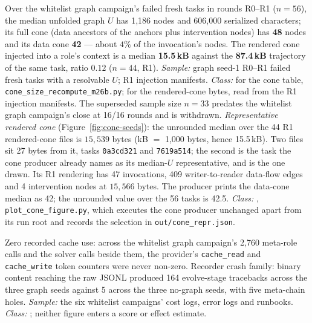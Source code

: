 \begin{description}[leftmargin=0pt,labelindent=0pt,labelsep=0pt,style=nextline,font=\normalfont,itemsep=6pt]
\item[\textbf{F55}\quad Cone size, and the rendered cone against the
      trajectory it competes with.]
Over the whitelist graph campaign's failed fresh tasks in rounds R0--R1
($n{=}56$), the median unfolded graph $U$ has 1{,}186 nodes and
606{,}000 serialized characters; its full cone (data ancestors of the
anchors plus intervention nodes) has \textbf{48} nodes and its data
cone \textbf{42} --- about $4\%$ of the invocation's nodes. The rendered
cone injected into a role's context is a median \textbf{15.5\,kB}
against the \textbf{87.4\,kB} trajectory of the same task, ratio
$0.12$ ($n{=}44$, R1). \emph{Sample:} graph seed-1 R0--R1 failed fresh tasks
with a resolvable $U$; R1 injection manifests. \emph{Class:} 
for the cone table, \texttt{cone\_size\_recompute\_m26b.py}; 
for the rendered-cone bytes, read from the R1 injection manifests. The
superseded sample size $n{=}33$ predates the whitelist graph campaign's
close at 16/16 rounds and is withdrawn.
\emph{Representative rendered cone} (Figure~\ref{fig:cone-seeds}): the
unrounded median over the 44 R1 rendered-cone files is
$15,539$ bytes (kB $=$ 1{,}000 bytes, hence
15.5\,kB). Two files sit 27 bytes from it, tasks \texttt{0a3cd321}
and \texttt{7619a514}; the second is the task the cone producer already
names as its median-$U$ representative, and is the one drawn. Its R1
rendering has 47 invocations, 409 writer-to-reader data-flow edges and 4 intervention nodes at
$15,566$ bytes. The producer prints the data-cone
median as 42; the unrounded value over the 56 tasks is 42.5. \emph{Class:}
, \texttt{plot\_cone\_figure.py}, which executes the cone producer
unchanged apart from its run root and records the selection in
\texttt{out/cone\_repr.json}.

\item[\textbf{F56}\quad Operations record: cache counters and the
      recorder's crash family.] 
Zero recorded cache use: across the whitelist graph campaign's 2{,}760 meta-role
calls and the solver calls beside them, the provider's
\texttt{cache\_read} and \texttt{cache\_write} token counters were never
non-zero. Recorder crash family: binary content reaching the raw JSONL
produced 164 evolve-stage tracebacks across the three graph seeds
against 5 across the three no-graph seeds, with five meta-chain holes.
\emph{Sample:} the six whitelist campaigns' cost logs, error logs and
runbooks. \emph{Class:} ; neither figure enters a score or effect estimate.


\end{description}

